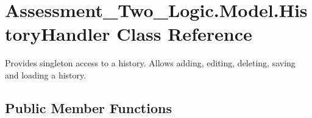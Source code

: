 \hypertarget{class_assessment___two___logic_1_1_model_1_1_history_handler}{
\section{Assessment\_\-Two\_\-Logic.Model.HistoryHandler Class Reference}
\label{class_assessment___two___logic_1_1_model_1_1_history_handler}
}


Provides singleton access to a history. Allows adding, editing, deleting, saving and loading a history.  


\subsection*{Public Member Functions}
